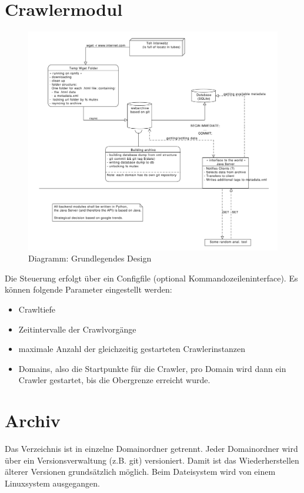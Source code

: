 \chapter{Crawlermodul}
\begin{figure}
	\centering
	\includegraphics[width=\textwidth]{spezi/webarchiv_design.pdf}
	\caption{Diagramm: Grundlegendes Design}
\end{figure}
Die Steuerung erfolgt über ein Configfile (optional Kommandozeileninterface).
Es können folgende Parameter eingestellt werden:
\begin{itemize}
	\item Crawltiefe
	\item Zeitintervalle der Crawlvorgänge
	\item maximale Anzahl der gleichzeitig gestarteten Crawlerinstanzen
	\item Domains, also die Startpunkte für die Crawler, pro Domain wird dann ein Crawler gestartet,
		bis die Obergrenze erreicht wurde.
\end{itemize}

\chapter{Archiv}
Das Verzeichnis ist in einzelne Domainordner getrennt. Jeder Domainordner wird über ein Versionsverwaltung
(z.B. git) versioniert. Damit ist das Wiederherstellen älterer Versionen grundsätzlich möglich.
Beim Dateisystem wird von einem Linuxsystem ausgegangen.

